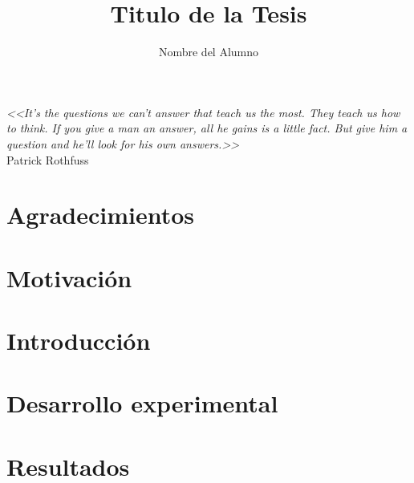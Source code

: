 \documentclass[letterpaper,spanish,12pt]{book}
\author{Nombre del Alumno}
\title{Titulo de la Tesis}
\begin{document}
\frontmatter
\maketitle %

\chapter*{}
\begin{flushright}
	{%
	\selectfont\emph{<<It's the questions we can't answer that teach us the most. They teach us how to think. If you give a man an answer, all he gains is a little fact. But give him a question and he'll look for his own answers.>>}\\
\vspace{5mm}
	Patrick Rothfuss}

\end{flushright}
\vfill
\chapter{Agradecimientos}
\lipsum[6-9]


\tableofcontents %
\mainmatter 
\chapter{Motivación}


\chapter{Introducción}


\chapter{Desarrollo experimental}


\chapter{Resultados}

\end{document}
